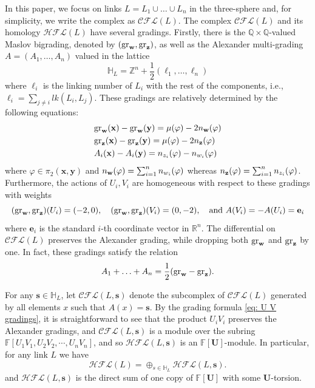 \documentclass[10pt,a4paper]{amsart}
\newtheorem{proposition}[theorem]{Proposition}
\newcommand{\F}{\mathbb{F}}
\newcommand{\cCFL}{\mathcal{C\!F\!L}}
\newcommand{\cHFL}{\mathcal{H\!F\! L}}
\newcommand{\ee}{\mathbf{e}}
\newcommand{\w}{\mathbf{w}}
\newcommand{\x}{\mathbf{x}}
\newcommand{\y}{\mathbf{y}}
\def\gr{\textup{gr}}
\def\w{{\bf{w}}}
\def\z{{\bf{z}}}
\def\x{\mathbf{x}}
\def\y{\mathbf{y}}
\newcommand{\HH}{\mathbb{H}}
\newcommand{\Z}{\mathbb{Z}}
\newcommand{\R}{\mathbb{R}}
\newcommand{\UU}{\mathbf{U}}
\newcommand{\EG}[1]{{\color{red}#1}}
\renewcommand{\ss}{\mathbf{s}}
\begin{document}
In this paper, we focus on links $L=L_1\cup \ldots \cup L_n$ in the three-sphere and, for simplicity, we write the complex as $\cCFL(L)$. The complex $\cCFL(L)$ and its homology $\cHFL(L)$ have several gradings. Firstly, there is the $\mathbb{Q}\times \mathbb{Q}$-valued Maslov bigrading, denoted by $(\gr_{\w}, \gr_{\z})$, as well as the Alexander multi-grading $A=(A_1, \ldots, A_n)$ valued in the lattice
$$\HH_L=\Z^n+\dfrac{1}{2}(\ell_1, \ldots, \ell_n)$$
where $\ell_i$ is the linking number of $L_i$ with the rest of the components, i.e., $\ell_i=\sum_{j\neq i} lk(L_i, L_j)$. These gradings are relatively determined by the following equations:
\begin{equation}\label{eq:relgradings}
\begin{split}
&\gr_{\w}(\x)-\gr_{\w}(\y)=\mu(\varphi)-2n_{\w}(\varphi)\\
&\gr_{\z}(\x)-\gr_{\z}(\y)=\mu(\varphi)-2n_{\z}(\varphi)\\
&A_i(\x)-A_{i}(\y)=n_{z_i}(\varphi)-n_{w_i}(\varphi)
\end{split}
\end{equation}
where $\varphi\in\pi_2(\x,\y)$ and $n_{\w}(\varphi)=\sum_{i=1}^nn_{w_i}(\varphi)$ whereas $n_{\z}(\varphi)=\sum_{i=1}^nn_{z_i}(\varphi)$. Furthermore, the actions of $U_i,V_i$ are homogeneous with respect to these gradings with weights
\begin{equation}
\label{eq: U V gradings}    
(\gr_{\w}, \gr_{\z})(U_i)=(-2, 0), \quad (\gr_{\w}, \gr_{\z})(V_i)=(0, -2), \quad \text{and } A(V_i)=-A(U_i)=\ee_i
\end{equation}
where $\ee_i$ is the standard $i$-th coordinate vector in $\R^n$. 
The differential on $\cCFL(L)$ preserves the Alexander grading, while dropping both $\gr_{\w}$ and $\gr_{\z}$ by  one. In fact, these gradings satisfy the relation
$$A_1+\ldots+A_n=\frac{1}{2} (\gr_{\w}-\gr_{\z}).$$






For any $\ss\in \HH_L$, let $\cCFL(L, \ss)$ denote the subcomplex of $\cCFL(L)$ generated by all elements $x$ such that $A(x)=\ss$. By the grading formula \eqref{eq: U V gradings}, it is straightforward to see that the product $U_iV_i$ preserves the Alexander gradings, and $\cCFL(L, \ss)$ is a module over the subring $\F[U_1V_1, U_2V_2, \cdots, U_nV_n]$, and so $\cHFL(L, \ss)$ is an $\F[\UU]$-module. In particular, for any link $L$ we have
$$\cHFL(L)=\oplus_{s\in \HH_L} \cHFL(L, \ss).$$
and $\cHFL(L, \ss)$ is the direct sum of one copy of $\F[\UU]$ with some $\UU$-torsion. 
\end{document}
